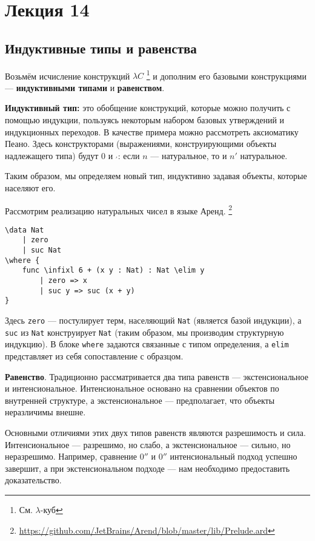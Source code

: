 \section{Лекция 14}

\newcommand{\ard}[1]{\texttt{#1}}

\subsection{Индуктивные типы и равенства}

Возьмём исчисление конструкций $\lambda C$ \footnote{См. $\lambda$-куб} и дополним его базовыми конструкциями --- \textbf{индуктивными типами} и \textbf{равенством}.

\medskip
\textbf{Индуктивный тип:} это обобщение конструкций, которые можно получить с помощью индукции,
пользуясь некоторым набором базовых утверждений и индукционных переходов. В качестве примера можно рассмотреть аксиоматику Пеано.
Здесь конструкторами (выражениями, конструирующими объекты надлежащего типа) будут $0$ и $_'$: если $n$ --- натуральное, то и $n'$ натуральное.

Таким образом, мы определяем новый тип, индуктивно задавая объекты, которые населяют его.

Рассмотрим реализацию натуральных чисел в языке Аренд. \footnote{\url{https://github.com/JetBrains/Arend/blob/master/lib/Prelude.ard}}
\begin{verbatim}
\data Nat
    | zero
    | suc Nat
\where {
    func \infixl 6 + (x y : Nat) : Nat \elim y
        | zero => x
        | suc y => suc (x + y)
}
\end{verbatim}

Здесь \ard{zero} --- постулирует терм, населяющий \ard{Nat} (является базой индукции), а \ard{suc} из \ard{Nat} конструирует \ard{Nat} (таким образом, мы производим структурную индукцию).
В блоке \ard{where} задаются связанные с типом определения, а \ard{elim} представляет из себя сопоставление с образцом.

\medskip
\textbf{Равенство}. Традиционно рассматривается два типа равенств --- экстенсиональное и интенсиональное.
Интенсиональное основано на сравнении объектов по внутренней структуре, а экстенсиональное --- предполагает, что объекты неразличимы внешне.

Основными отличиями этих двух типов равенств являются разрешимость и сила. Интенсиональное --- разрешимо, но слабо, а экстенсиональное --- сильно, но неразрешимо.
Например, сравнение $0''$ и $0''$ интенсиональный подход успешно завершит, а при экстенсиональном подходе --- нам необходимо предоставить доказательство.

